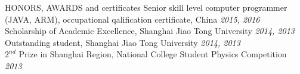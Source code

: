 \documentclass{resume} %
\begin{document}
\begin{rSection}{HONORS, AWARDS and certificates}
Senior skill level computer programmer (JAVA, ARM), occupational qalification certificate, China \hfill \emph{2015, 2016}
\\Scholarship of Academic Excellence, Shanghai Jiao Tong University \hfill \emph{2014, 2013}
\\Outstanding student, Shanghai Jiao Tong University \hfill \emph{2014, 2013}
\\$2^{nd}$ Prize in Shanghai Region, National College Student Physics Competition \hfill \emph{2013}
\end{rSection}





\end{document}
